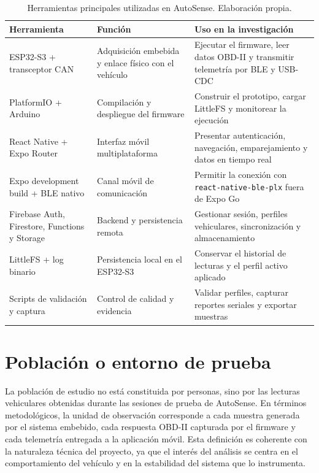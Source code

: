 \documentclass[12pt,letterpaper]{report}
\begin{document}
\begin{table}[!htbp]
\centering
\caption{Herramientas principales utilizadas en AutoSense. Elaboración propia.}
\label{tab:herramientas-utilizadas}
\renewcommand{\arraystretch}{1.08}
\small
\begin{tabular}{p{}p{}p{}}
\toprule
Herramienta & Función & Uso en la investigación \\
\midrule
ESP32-S3 + transceptor CAN & Adquisición embebida y enlace físico con el vehículo & Ejecutar el firmware, leer datos OBD-II y transmitir telemetría por BLE y USB-CDC \\
PlatformIO + Arduino & Compilación y despliegue del firmware & Construir el prototipo, cargar LittleFS y monitorear la ejecución \\
React Native + Expo Router & Interfaz móvil multiplataforma & Presentar autenticación, navegación, emparejamiento y datos en tiempo real \\
Expo development build + BLE nativo & Canal móvil de comunicación & Permitir la conexión con \texttt{react-native-ble-plx} fuera de Expo Go \\
Firebase Auth, Firestore, Functions y Storage & Backend y persistencia remota & Gestionar sesión, perfiles vehiculares, sincronización y almacenamiento \\
LittleFS + log binario & Persistencia local en el ESP32-S3 & Conservar el historial de lecturas y el perfil activo aplicado \\
Scripts de validación y captura & Control de calidad y evidencia & Validar perfiles, capturar reportes seriales y exportar muestras \\
\bottomrule
\end{tabular}
\end{table}

\section{Población o entorno de prueba}

\label{sec:poblacion-entorno-prueba}

La población de estudio no está constituida por personas, sino por las lecturas vehiculares obtenidas durante las sesiones de prueba de AutoSense. En términos metodológicos, la unidad de observación corresponde a cada muestra generada por el sistema embebido, cada respuesta OBD-II capturada por el firmware y cada telemetría entregada a la aplicación móvil. Esta definición es coherente con la naturaleza técnica del proyecto, ya que el interés del análisis se centra en el comportamiento del vehículo y en la estabilidad del sistema que lo instrumenta.
\end{document}
